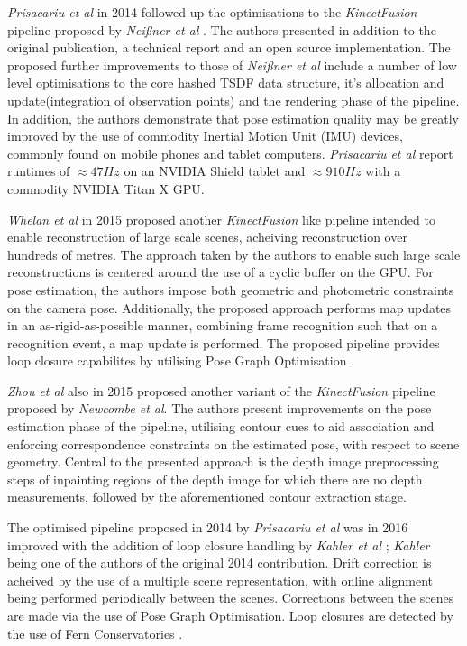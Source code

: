 \textit{Prisacariu et al} \cite{Prisacariu2014, Kahler2015} in 2014 followed up the optimisations 
to the \textit{KinectFusion} pipeline proposed by \textit{Nei{\ss}ner et al} \cite{NieBner2013}. 
The authors presented in addition to the original publication, a technical report and an open 
source implementation. The proposed further improvements to those of \textit{Nei{\ss}ner et al} 
\cite{NieBner2013} include a number of low level optimisations to the core hashed TSDF data 
structure, it's allocation and update(integration of observation points) and the rendering 
phase of the pipeline. In addition, the authors demonstrate that pose estimation quality may 
be greatly improved by the use of commodity Inertial Motion Unit (IMU) devices, commonly found 
on mobile phones and tablet computers. \textit{Prisacariu et al} report runtimes of 
$\approx47Hz$ on an NVIDIA Shield tablet and $\approx910Hz$ with a commodity NVIDIA Titan X GPU.

\textit{Whelan et al} \cite{Whelan2015} in 2015 proposed another \textit{KinectFusion} 
\cite{Newcombe2011} like pipeline intended to enable reconstruction of large scale scenes, 
acheiving reconstruction over hundreds of metres. The approach taken by the authors to enable 
such large scale reconstructions is centered around the use of a cyclic buffer on the GPU. For pose 
estimation, the authors impose both geometric and photometric constraints on the camera pose. 
Additionally, the proposed approach performs map updates in an as-rigid-as-possible \cite{ARAP} 
manner, combining frame recognition such that on a recognition event, a map update is performed.
The proposed pipeline provides loop closure capabilites by utilising Pose Graph Optimisation 
\cite{PGO}.

\textit{Zhou et al} \cite{Zhou2015} also in 2015 proposed another variant of the 
\textit{KinectFusion} \cite{Newcombe2011} pipeline proposed by \textit{Newcombe et al}. 
The authors present improvements on the pose estimation phase of the pipeline, utilising 
contour cues to aid association and enforcing correspondence constraints on the estimated 
pose, with respect to scene geometry. Central to the presented approach is the depth image 
preprocessing steps of inpainting regions of the depth image for which there are no depth 
measurements, followed by the aforementioned contour extraction stage.

The optimised pipeline proposed in 2014 by \textit{Prisacariu et al} was in 2016 improved with 
the addition of loop closure handling by \textit{Kahler et al} \cite{Kahler2016}; \textit{Kahler} 
being one of the authors of the original 2014 contribution. Drift correction is acheived by the 
use of a multiple scene representation, with online alignment being performed periodically 
between the scenes. Corrections between the scenes are made via the use of Pose Graph Optimisation. 
Loop closures are detected by the use of Fern Conservatories \cite{GLOCKER}.

